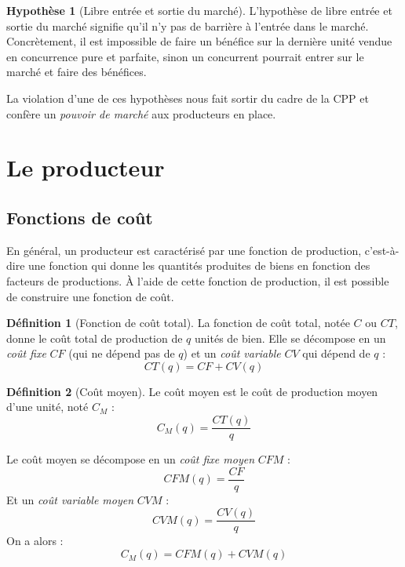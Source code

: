 \documentclass[
  a4paper,
]{book}
\theoremstyle{definition}
\newtheorem{definition}{Définition}[chapter]
\theoremstyle{definition}
\theoremstyle{definition}
\theoremstyle{definition}
\newtheorem{hypothesis}{Hypothèse}[chapter]
\theoremstyle{remark}
\begin{document}
\begin{hypothesis}[Libre entrée et sortie du marché]
L'hypothèse de libre entrée et sortie du marché signifie qu'il n'y pas de barrière à l'entrée dans le marché.
Concrètement, il est impossible de faire un bénéfice sur la dernière unité vendue en concurrence pure et parfaite, sinon un concurrent pourrait entrer sur le marché et faire des bénéfices.
\end{hypothesis}

La violation d'une de ces hypothèses nous fait sortir du cadre de la CPP et confère un \emph{pouvoir de marché} aux producteurs en place.

\hypertarget{le-producteur}{%
\section{Le producteur}\label{le-producteur}}

\hypertarget{fonctions-de-couxfbt}{%
\subsection{Fonctions de coût}\label{fonctions-de-couxfbt}}

En général, un producteur est caractérisé par une fonction de production, c'est-à-dire une fonction qui donne les quantités produites de biens en fonction des facteurs de productions.
À l'aide de cette fonction de production, il est possible de construire une fonction de coût.

\begin{definition}[Fonction de coût total]
La fonction de coût total, notée \(C\) ou \(CT\), donne le coût total de production de \(q\) unités de bien.
Elle se décompose en un \emph{coût fixe} \(CF\) (qui ne dépend pas de \(q\)) et un \emph{coût variable} \(CV\) qui dépend de \(q\) :
\[CT(q)=CF+ CV(q)\]
\end{definition}

\begin{definition}[Coût moyen]
Le coût moyen est le coût de production moyen d'une unité, noté \(C_M\) :
\[C_M(q) = \frac{CT(q)}{q}\]
\end{definition}

Le coût moyen se décompose en un \emph{coût fixe moyen} \(CFM\) :
\[CFM(q)=\frac{CF}{q}\]
Et un \emph{coût variable moyen} \(CVM\) :
\[CVM(q)=\frac{CV(q)}{q}\]
On a alors :
\begin{equation}
C_M(q)=CFM(q) +CVM(q)
\label{eq:CM}
\end{equation}
\end{document}
